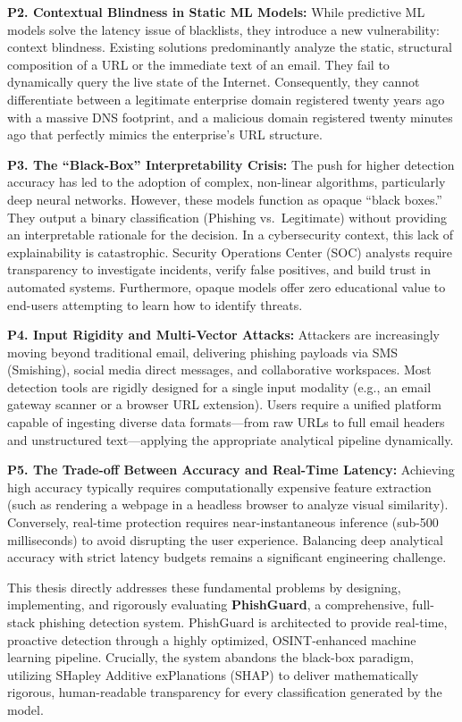 \textbf{P2. Contextual Blindness in Static ML Models:} While predictive
ML models solve the latency issue of blacklists, they introduce a new
vulnerability: context blindness. Existing solutions predominantly
analyze the static, structural composition of a URL or the immediate
text of an email. They fail to dynamically query the live state of the
Internet. Consequently, they cannot differentiate between a legitimate
enterprise domain registered twenty years ago with a massive DNS
footprint, and a malicious domain registered twenty minutes ago that
perfectly mimics the enterprise's URL structure.

\textbf{P3. The ``Black-Box'' Interpretability Crisis:} The push for
higher detection accuracy has led to the adoption of complex, non-linear
algorithms, particularly deep neural networks. However, these models
function as opaque ``black boxes.'' They output a binary classification
(Phishing vs.~Legitimate) without providing an interpretable rationale
for the decision. In a cybersecurity context, this lack of
explainability is catastrophic. Security Operations Center (SOC)
analysts require transparency to investigate incidents, verify false
positives, and build trust in automated systems. Furthermore, opaque
models offer zero educational value to end-users attempting to learn how
to identify threats.

\textbf{P4. Input Rigidity and Multi-Vector Attacks:} Attackers are
increasingly moving beyond traditional email, delivering phishing
payloads via SMS (Smishing), social media direct messages, and
collaborative workspaces. Most detection tools are rigidly designed for
a single input modality (e.g., an email gateway scanner or a browser URL
extension). Users require a unified platform capable of ingesting
diverse data formats---from raw URLs to full email headers and
unstructured text---applying the appropriate analytical pipeline
dynamically.

\textbf{P5. The Trade-off Between Accuracy and Real-Time Latency:}
Achieving high accuracy typically requires computationally expensive
feature extraction (such as rendering a webpage in a headless browser to
analyze visual similarity). Conversely, real-time protection requires
near-instantaneous inference (sub-500 milliseconds) to avoid disrupting
the user experience. Balancing deep analytical accuracy with strict
latency budgets remains a significant engineering challenge.

This thesis directly addresses these fundamental problems by designing,
implementing, and rigorously evaluating \textbf{PhishGuard}, a
comprehensive, full-stack phishing detection system. PhishGuard is
architected to provide real-time, proactive detection through a highly
optimized, OSINT-enhanced machine learning pipeline. Crucially, the
system abandons the black-box paradigm, utilizing SHapley Additive
exPlanations (SHAP) to deliver mathematically rigorous, human-readable
transparency for every classification generated by the model.

